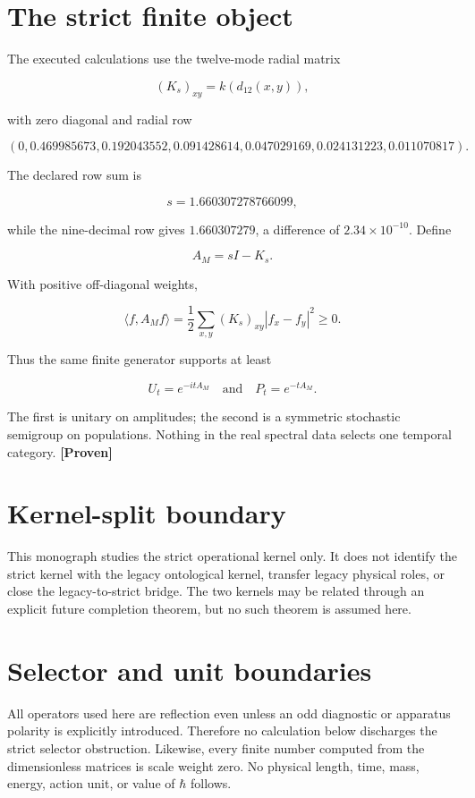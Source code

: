 \documentclass[11pt,a4paper,openany]{report}
\newcommand{\statusProven}{\textcolor{fingreen}{[Proven]}}
\begin{document}
\section{The strict finite object}

The executed calculations use the twelve-mode radial matrix

\[
(K_s)_{xy}=k(d_{12}(x,y)),
\]

with zero diagonal and radial row

\[
(0,
0.469985673,
0.192043552,
0.091428614,
0.047029169,
0.024131223,
0.011070817).
\]

The declared row sum is

\[
s=1.660307278766099,
\]

while the nine-decimal row gives \(1.660307279\), a difference of \(2.34\times10^{-10}\). Define

\[
A_M=sI-K_s.
\]

With positive off-diagonal weights,

\[
\langle f,A_Mf\rangle
=\frac12\sum_{x,y}(K_s)_{xy}|f_x-f_y|^2\ge0.
\]

Thus the same finite generator supports at least

\[
U_t=e^{-itA_M}
\quad\text{and}\quad
P_t=e^{-tA_M}.
\]

The first is unitary on amplitudes; the second is a symmetric stochastic semigroup on populations. Nothing in the real spectral data selects one temporal category. \textbf{\statusProven{}}

\section{Kernel-split boundary}

This monograph studies the strict operational kernel only. It does not identify the strict kernel with the legacy ontological kernel, transfer legacy physical roles, or close the legacy-to-strict bridge. The two kernels may be related through an explicit future completion theorem, but no such theorem is assumed here.

\section{Selector and unit boundaries}

All operators used here are reflection even unless an odd diagnostic or apparatus polarity is explicitly introduced. Therefore no calculation below discharges the strict selector obstruction. Likewise, every finite number computed from the dimensionless matrices is scale weight zero. No physical length, time, mass, energy, action unit, or value of \(\hbar\) follows.
\end{document}
